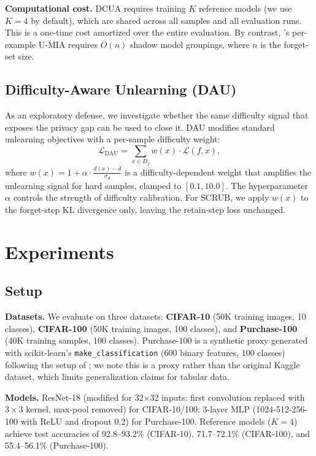 \documentclass{article}
\newcommand{\dau}{\text{DAU}}
\begin{document}
\textbf{Computational cost.}
DCUA requires training $K$ reference models (we use $K=4$ by default), which are shared across all samples and all evaluation runs.
This is a one-time cost amortized over the entire evaluation.
By contrast, \citet{hayes2025inexact}'s per-example U-MIA requires $O(n)$ shadow model groupings, where $n$ is the forget-set size.

\subsection{Difficulty-Aware Unlearning (DAU)}

As an exploratory defense, we investigate whether the same difficulty signal that exposes the privacy gap can be used to close it.
DAU modifies standard unlearning objectives with a per-sample difficulty weight:
\begin{equation}
    \mathcal{L}_{\dau} = \sum_{x \in D_f} w(x) \cdot \mathcal{L}(f, x),
\end{equation}
where $w(x) = 1 + \alpha \cdot \frac{d(x) - \bar{d}}{\sigma_d}$ is a difficulty-dependent weight that amplifies the unlearning signal for hard samples, clamped to $[0.1, 10.0]$.
The hyperparameter $\alpha$ controls the strength of difficulty calibration.
For SCRUB, we apply $w(x)$ to the forget-step KL divergence only, leaving the retain-step loss unchanged.

\section{Experiments}
\label{sec:experiments}

\subsection{Setup}

\textbf{Datasets.}
We evaluate on three datasets: \textbf{CIFAR-10} (50K training images, 10 classes), \textbf{CIFAR-100} (50K training images, 100 classes), and \textbf{Purchase-100} (40K training samples, 100 classes).
Purchase-100 is a synthetic proxy generated with scikit-learn's \texttt{make\_classification} (600 binary features, 100 classes) following the setup of \citet{shokri2017membership}; we note this is a proxy rather than the original Kaggle dataset, which limits generalization claims for tabular data.

\textbf{Models.}
ResNet-18 (modified for 32$\times$32 inputs: first convolution replaced with $3 \times 3$ kernel, max-pool removed) for CIFAR-10/100; 3-layer MLP (1024-512-256-100 with ReLU and dropout 0.2) for Purchase-100.
Reference models ($K=4$) achieve test accuracies of 92.8--93.2\% (CIFAR-10), 71.7--72.1\% (CIFAR-100), and 55.4--56.1\% (Purchase-100).
\end{document}
